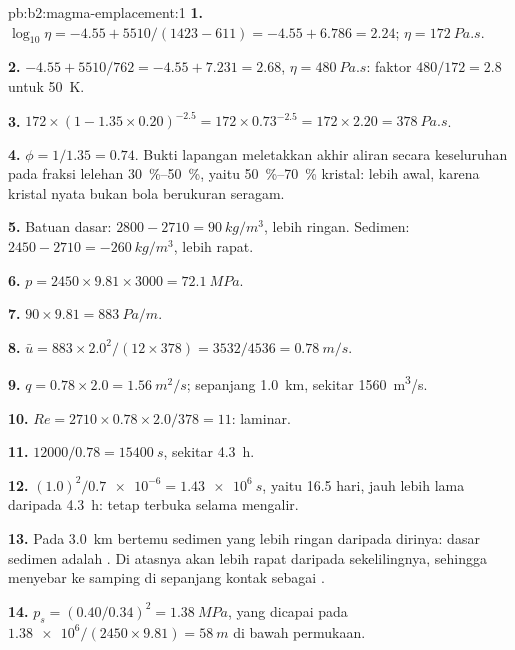 \begin{solution}{pb:b2:magma-emplacement:1}
\textbf{1.} $\log_{10}\eta = -4.55 + 5510/(1423 - 611) = -4.55 + 6.786 = 2.24$;
$\eta = \qty{172}{Pa.s}$.

\textbf{2.} $-4.55 + 5510/762 = -4.55 + 7.231 = 2.68$, $\eta = \qty{480}{Pa.s}$:
faktor $480/172 = 2.8$ untuk \qty{50}{K}.

\textbf{3.} $172\times(1 - 1.35\times0.20)^{-2.5} = 172\times0.73^{-2.5} = 172\times2.20 =
\qty{378}{Pa.s}$.

\textbf{4.} $\phi = 1/1.35 = 0.74$. Bukti lapangan meletakkan akhir aliran secara keseluruhan
pada fraksi lelehan \qtyrange{30}{50}{\percent}, yaitu
\qtyrange{50}{70}{\percent} kristal: lebih awal, karena kristal nyata bukan
bola berukuran seragam.

\textbf{5.} Batuan dasar: $2800 - 2710 = \qty{90}{kg/m^3}$,  lebih ringan.
Sedimen: $2450 - 2710 = \qty{-260}{kg/m^3}$,  lebih rapat.

\textbf{6.} $p = 2450\times9.81\times3000 = \qty{72.1}{MPa}$.

\textbf{7.} $90\times9.81 = \qty{883}{Pa/m}$.

\textbf{8.} $\bar u = 883\times2.0^2/(12\times378) = 3532/4536 = \qty{0.78}{m/s}$.

\textbf{9.} $q = 0.78\times2.0 = \qty{1.56}{m^2/s}$; sepanjang \qty{1.0}{km}, sekitar
\qty{1560}{m^3/s}.

\textbf{10.} $Re = 2710\times0.78\times2.0/378 = 11$: laminar.

\textbf{11.} $12000/0.78 = \qty{15400}{s}$, sekitar \qty{4.3}{h}.

\textbf{12.} $(1.0)^2/\num{0.7e-6} = \qty{1.43e6}{s}$, yaitu 16.5 hari, jauh lebih lama daripada
\qty{4.3}{h}:  tetap terbuka selama  mengalir.

\textbf{13.} Pada \qty{3.0}{km}  bertemu sedimen yang lebih ringan daripada dirinya:
dasar sedimen adalah . Di atasnya  akan
lebih rapat daripada sekelilingnya, sehingga  menyebar ke samping di sepanjang kontak sebagai
.

\textbf{14.} $p_s = (0.40/0.34)^2 = \qty{1.38}{MPa}$, yang dicapai pada
$\num{1.38e6}/(2450\times9.81) = \qty{58}{m}$ di bawah permukaan.


\end{solution}
